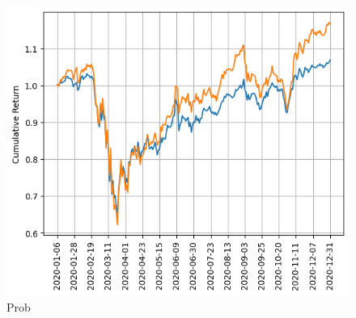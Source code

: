 %
%
%
%
%
%
%
%
%
%
\begin{figure}[h]
  \begin{center}
    \includegraphics[width=0.6\linewidth]{figures/replica_portfolio}
  \end{center}
  \caption{Prob}
  \label{fig:replica_portfolio_return}
\end{figure}


